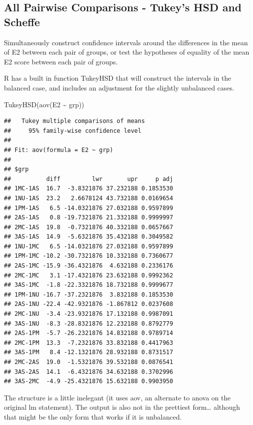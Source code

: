 \documentclass[
]{book}
\newenvironment{Shaded}{\begin{snugshade}}{\end{snugshade}}
\newcommand{\FunctionTok}[1]{\textcolor[rgb]{0.00,0.00,0.00}{#1}}
\newcommand{\NormalTok}[1]{#1}
\newcommand{\SpecialCharTok}[1]{\textcolor[rgb]{0.00,0.00,0.00}{#1}}
\begin{document}
\hypertarget{all-pairwise-comparisons---tukeys-hsd-and-scheffe}{%
\subsection{All Pairwise Comparisons - Tukey's HSD and Scheffe}\label{all-pairwise-comparisons---tukeys-hsd-and-scheffe}}

Simultaneously construct confidence intervals around the differences in the mean of E2 between each pair of groups, or test the hypotheses of equality of the mean E2 score between each pair of groups.

R has a built in function TukeyHSD that will construct the intervals in the balanced case, and includes an adjustment for the slightly unbalanced cases.

\begin{Shaded}
\begin{Highlighting}[]
\FunctionTok{TukeyHSD}\NormalTok{(}\FunctionTok{aov}\NormalTok{(E2 }\SpecialCharTok{\textasciitilde{}}\NormalTok{ grp))}
\end{Highlighting}
\end{Shaded}

\begin{verbatim}
##   Tukey multiple comparisons of means
##     95% family-wise confidence level
## 
## Fit: aov(formula = E2 ~ grp)
## 
## $grp
##          diff         lwr       upr     p adj
## 1MC-1AS  16.7  -3.8321876 37.232188 0.1853530
## 1NU-1AS  23.2   2.6678124 43.732188 0.0169654
## 1PM-1AS   6.5 -14.0321876 27.032188 0.9597899
## 2AS-1AS   0.8 -19.7321876 21.332188 0.9999997
## 2MC-1AS  19.8  -0.7321876 40.332188 0.0657667
## 3AS-1AS  14.9  -5.6321876 35.432188 0.3049582
## 1NU-1MC   6.5 -14.0321876 27.032188 0.9597899
## 1PM-1MC -10.2 -30.7321876 10.332188 0.7360677
## 2AS-1MC -15.9 -36.4321876  4.632188 0.2336176
## 2MC-1MC   3.1 -17.4321876 23.632188 0.9992362
## 3AS-1MC  -1.8 -22.3321876 18.732188 0.9999677
## 1PM-1NU -16.7 -37.2321876  3.832188 0.1853530
## 2AS-1NU -22.4 -42.9321876 -1.867812 0.0237608
## 2MC-1NU  -3.4 -23.9321876 17.132188 0.9987091
## 3AS-1NU  -8.3 -28.8321876 12.232188 0.8792779
## 2AS-1PM  -5.7 -26.2321876 14.832188 0.9789714
## 2MC-1PM  13.3  -7.2321876 33.832188 0.4417963
## 3AS-1PM   8.4 -12.1321876 28.932188 0.8731517
## 2MC-2AS  19.0  -1.5321876 39.532188 0.0876541
## 3AS-2AS  14.1  -6.4321876 34.632188 0.3702996
## 3AS-2MC  -4.9 -25.4321876 15.632188 0.9903950
\end{verbatim}

The structure is a little inelegant (it uses aov, an alternate to anova on the original lm statement). The output is also not in the prettiest form\ldots{} although that might be the only form that works if it is unbalanced.
\end{document}
